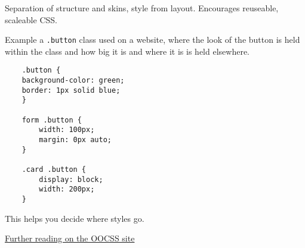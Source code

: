 Separation of structure and skins, style from layout. Encourages reuseable, scaleable CSS.

Example a \texttt{.button} class used on a website, where the look of the button is held within the class and how big it is and where it is is held elsewhere.

\begin{verbatim}
    .button {
    background-color: green;
    border: 1px solid blue;
    }

    form .button {
        width: 100px;
        margin: 0px auto;
    }

    .card .button {
        display: block;
        width: 200px;
    }
\end{verbatim}

This helps you decide where styles go.

\href{http://oocss.org/}{Further reading on the OOCSS site}